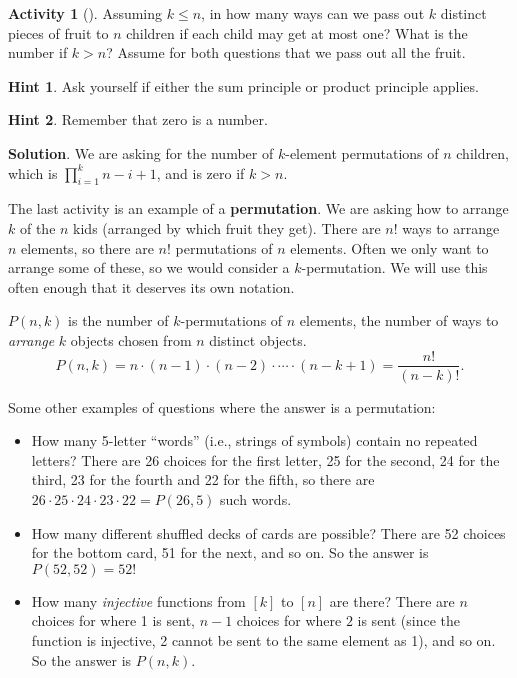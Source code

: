 \documentclass[10pt,]{book}
\newcommand{\terminology}[1]{\textbf{#1}}
\theoremstyle{plain}
\theoremstyle{definition}
\theoremstyle{definition}
\theoremstyle{definition}
\newtheorem{activity}[project]{Activity}
\numberwithin{equation}{chapter}
\begin{document}
\begin{activity}[]\label{activity-83}
\hypertarget{p-649}{}%
Assuming \(k\le n\), in how many ways can we pass out \(k\) distinct pieces of fruit to \(n\) children if each child may get at most one? What is the number if \(k>n\)? Assume for both questions that we pass out all the fruit.%
\par\smallskip%
\noindent\textbf{Hint 1}.\hypertarget{hint-43}{}\quad%
\hypertarget{p-650}{}%
Ask yourself if either the sum principle or product principle applies.%
\par\smallskip%
\noindent\textbf{Hint 2}.\hypertarget{hint-44}{}\quad%
\hypertarget{p-651}{}%
Remember that zero is a number.%
\par\smallskip%
\noindent\textbf{Solution}.\hypertarget{solution-41}{}\quad%
\hypertarget{p-652}{}%
We are asking for the number of \(k\)-element permutations of \(n\) children, which is \(\prod_{i=1}^k n-i+1\), and is zero if \(k>n\).%
\end{activity}
\hypertarget{p-653}{}%
The last activity is an example of a \terminology{permutation}.  We are asking how to arrange \(k\) of the \(n\) kids (arranged by which fruit they get).  There are \(n!\) ways to arrange \(n\) elements, so there are \(n!\) permutations of \(n\) elements.  Often we only want to arrange some of these, so we would consider a \(k\)-permutation.   We will use this often enough that it deserves its own notation.%
\begin{assemblage}\label{assemblage-permutation}
\hypertarget{p-654}{}%
\(P(n,k)\) is the number of \(k\)-permutations of \(n\) elements, the number of ways to \emph{arrange} \(k\) objects chosen from \(n\) distinct objects.%
\begin{equation*}
P(n,k) = n\cdot (n-1) \cdot (n-2) \cdot \cdots \cdot (n-k+1) = \frac{n!}{(n-k)!}.
\end{equation*}
%
\end{assemblage}
\hypertarget{p-655}{}%
Some other examples of questions where the answer is a permutation: \leavevmode%
\begin{itemize}[label=\textbullet]
\item{}\hypertarget{p-656}{}%
How many 5-letter ``words'' (i.e., strings of symbols) contain no repeated letters?  There are 26 choices for the first letter, 25 for the second, 24 for the third, 23 for the fourth and 22 for the fifth, so there are \(26\cdot 25 \cdot 24 \cdot 23 \cdot 22 = P(26,5)\) such words.%
\item{}\hypertarget{p-657}{}%
How many different shuffled decks of cards are possible?  There are 52 choices for the bottom card, 51 for the next, and so on.  So the answer is \(P(52,52) = 52!\)%
\item{}\hypertarget{p-658}{}%
How many \emph{injective} functions from \([k]\) to \([n]\) are there?  There are \(n\) choices for where 1 is sent, \(n-1\) choices for where \(2\) is sent (since the function is injective, 2 cannot be sent to the same element as 1), and so on.  So the answer is \(P(n,k)\).%
\end{itemize}
\end{document}
